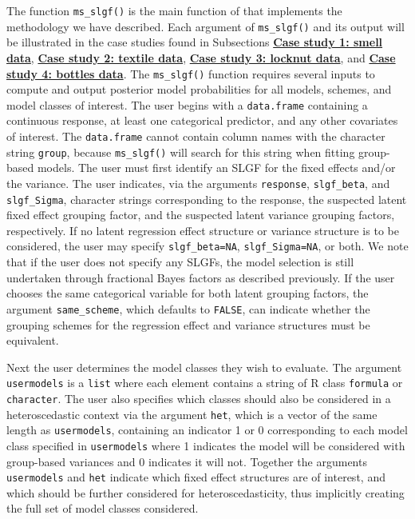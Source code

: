 The function \texttt{ms\_slgf()} is the main function of  that implements the methodology we have described. Each argument of \texttt{ms\_slgf()} and its output will be illustrated in the case studies found in Subsections \hyperlink{subsection:smell}{\textbf{Case study 1: smell data}}, \hyperlink{subsection:textile}{\textbf{Case study 2: textile data}}, \hyperlink{subsection:torque}{\textbf{Case study 3: locknut data}}, and \hyperlink{subsection:bottles}{\textbf{Case study 4: bottles data}}. The \texttt{ms\_slgf()} function requires several inputs to compute and output posterior model probabilities for all models, schemes, and model classes of interest. The user begins with a \texttt{data.frame} containing a continuous response, at least one categorical predictor, and any other covariates of interest. The \texttt{data.frame} cannot contain column names with the character string \texttt{group}, because \texttt{ms\_slgf()} will search for this string when fitting group-based models. The user must first identify an SLGF for the fixed effects and/or the variance. The user indicates, via the arguments \texttt{response}, \texttt{slgf\_beta}, and \texttt{slgf\_Sigma}, character strings corresponding to the response, the suspected latent fixed effect grouping factor, and the suspected latent variance grouping factors, respectively. If no latent regression effect structure or variance structure is to be considered, the user may specify \texttt{slgf\_beta=NA}, \texttt{slgf\_Sigma=NA}, or both. We note that if the user does not specify any SLGFs, the model selection is still undertaken through fractional Bayes factors as described previously. If the user chooses the same categorical variable for both latent grouping factors, the argument \texttt{same\_scheme}, which defaults to \texttt{FALSE}, can indicate whether the grouping schemes for the regression effect and variance structures must be equivalent. 

Next the user determines the model classes they wish to evaluate. The argument \texttt{usermodels} is a \texttt{list} where each element contains a string of R class \texttt{formula} or \texttt{character}. The user also specifies which classes should also be considered in a heteroscedastic context via the argument \texttt{het}, which is a vector of the same length as \texttt{usermodels}, containing an indicator 1 or 0 corresponding to each model class specified in \texttt{usermodels} where 1 indicates the model will be considered with group-based variances and 0 indicates it will not. Together the arguments \texttt{usermodels} and \texttt{het} indicate which fixed effect structures are of interest, and which should be further considered for heteroscedasticity, thus implicitly creating the full set of model classes considered.  

